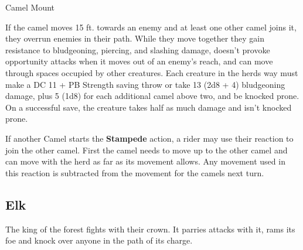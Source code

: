 \documentclass[letterpaper,twocolumn,openany,nodeprecatedcode]{dndbook}
\begin{document}
\begin{DndMonster}[float*=b,width=\textwidth + 8pt]{Camel Mount}
\begin{multicols}{2}
    If the camel moves 15 ft. towards an enemy and at least one other camel joins it, they overrun enemies in their path. While they move together they gain resistance to bludgeoning, piercing, and slashing damage, doesn’t provoke opportunity attacks when it moves out of an enemy’s reach, and can move through spaces occupied by other creatures. Each creature in the herds way must make a DC 11 + PB Strength saving throw or take 13 (2d8 + 4) bludgeoning damage, plus 5 (1d8) for each additional camel above two, and be knocked prone. On a successful save, the creature takes half as much damage and isn’t knocked prone.


    If another Camel starts the \textbf{Stampede} action, a rider may use their reaction to join the other camel. First the camel needs to move up to the other camel and can move with the herd as far as its movement allows. Any movement used in this reaction is subtracted from the movement for the camels next turn.

  \end{multicols}
\end{DndMonster}

\subsection{Elk}
The king of the forest fights with their crown.
It parries attacks with it, rams its foe and knock over anyone in the path of its charge.
\end{document}
